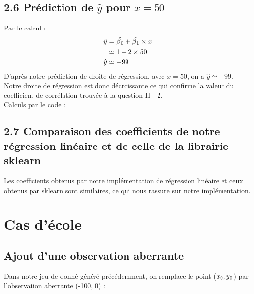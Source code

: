 \documentclass[paper=a4, fontsize=11pt]{scrartcl} %
\numberwithin{equation}{section} %
\numberwithin{figure}{section} %
\numberwithin{table}{section} %
\begin{document}
	\subsection*{2.6 Prédiction de $\hat{y}$ pour $x=50$}
	Par le calcul :
	\begin{align} 
	\begin{split}
	\hat{y}	&= \hat{\beta\textsubscript{0}}+\hat{\beta\textsubscript{1}}\times x\\
	&\simeq1-2\times50\\
	\hat{y}&\simeq-99\\
	\end{split}					
	\end{align}
	D'après notre prédiction de droite de régression, avec $x=50$, on a $\hat{y} \simeq -99$. Notre droite de régression est donc décroissante ce qui confirme la valeur du coefficient de corrélation trouvée à la question II - 2.\\
	
	Calculs par le code :
	\begin{center}
		\end{center}

	\subsection*{2.7 Comparaison des coefficients de notre régression linéaire et de celle de la librairie sklearn}
		\begin{center}
		\end{center}
		Les coefficients obtenus par notre implémentation de régression linéaire et ceux obtenus par sklearn sont similaires, ce qui nous rassure sur notre implémentation.

\newpage
\section{Cas d'école}

\subsection{Ajout d'une observation aberrante}
	Dans notre jeu de donné généré précédemment, on remplace le point ($x\textsubscript{0}, y\textsubscript{0}$) par l'observation aberrante (-100, 0) :
	\begin{center}
	\end{center}
\end{document}
